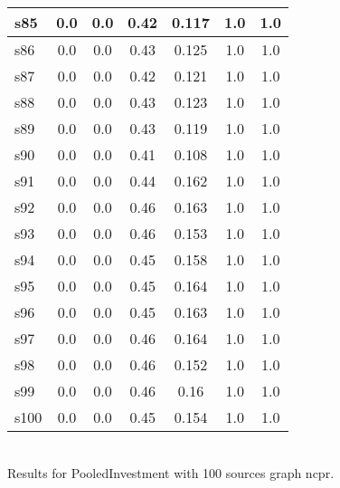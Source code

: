 \documentclass{article}
\begin{document}
\begin{tabular}{|l|c|c|c|c|c|c|}
\hline
s85 &0.0 & 0.0 & 0.42 & 0.117 & 1.0 & 1.0\\
\hline
s86 &0.0 & 0.0 & 0.43 & 0.125 & 1.0 & 1.0\\
\hline
s87 &0.0 & 0.0 & 0.42 & 0.121 & 1.0 & 1.0\\
\hline
s88 &0.0 & 0.0 & 0.43 & 0.123 & 1.0 & 1.0\\
\hline
s89 &0.0 & 0.0 & 0.43 & 0.119 & 1.0 & 1.0\\
\hline
s90 &0.0 & 0.0 & 0.41 & 0.108 & 1.0 & 1.0\\
\hline
s91 &0.0 & 0.0 & 0.44 & 0.162 & 1.0 & 1.0\\
\hline
s92 &0.0 & 0.0 & 0.46 & 0.163 & 1.0 & 1.0\\
\hline
s93 &0.0 & 0.0 & 0.46 & 0.153 & 1.0 & 1.0\\
\hline
s94 &0.0 & 0.0 & 0.45 & 0.158 & 1.0 & 1.0\\
\hline
s95 &0.0 & 0.0 & 0.45 & 0.164 & 1.0 & 1.0\\
\hline
s96 &0.0 & 0.0 & 0.45 & 0.163 & 1.0 & 1.0\\
\hline
s97 &0.0 & 0.0 & 0.46 & 0.164 & 1.0 & 1.0\\
\hline
s98 &0.0 & 0.0 & 0.46 & 0.152 & 1.0 & 1.0\\
\hline
s99 &0.0 & 0.0 & 0.46 & 0.16 & 1.0 & 1.0\\
\hline
s100 &0.0 & 0.0 & 0.45 & 0.154 & 1.0 & 1.0\\
\hline
\end{tabular}\\

\noindent Results for PooledInvestment with 100 sources graph ncpr.
\end{document}
